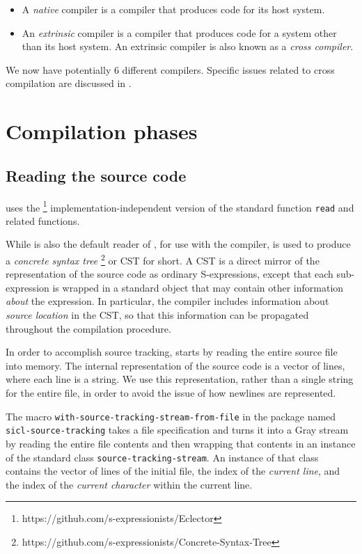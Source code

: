 \begin{itemize}
\item A \emph{native} compiler is a compiler that produces code for
  its host \commonlisp{} system. 
\item An \emph{extrinsic} compiler is a compiler that produces code
  for a \commonlisp{} system other than its host system.  An extrinsic
  compiler is also known as a \emph{cross compiler}.
\end{itemize}

We now have potentially 6 different compilers.  Specific issues
related to cross compilation are discussed in
. 

\section{Compilation phases}

\subsection{Reading the source code}

\sysname{} uses the \eclector{}%
\footnote{https://github.com/s-expressionists/Eclector}
implementation-independent version of the standard function
\texttt{read} and related functions.

While \eclector{} is also the default reader of \sysname{}, for use
with the compiler, \eclector{} is used to produce a \emph{concrete
  syntax tree}%
\footnote{https://github.com/s-expressionists/Concrete-Syntax-Tree} or
CST for short.  A CST is a direct mirror of the representation of the
source code as ordinary S-expressions, except that each sub-expression
is wrapped in a standard object that may contain other information
\emph{about} the expression.  In particular, the \sysname{} compiler
includes information about \emph{source location} in the CST, so that
this information can be propagated throughout the compilation
procedure.

In order to accomplish source tracking, \sysname{} starts by reading
the entire source file into memory.  The internal representation of
the source code is a vector of lines, where each line is a string.  We
use this representation, rather than a single string for the entire
file, in order to avoid the issue of how newlines are represented.

The macro \texttt{with-source-tracking-stream-from-file} in the
package named \texttt{sicl-source-tracking} takes a file
specification and turns it into a Gray stream by reading the entire
file contents and then wrapping that contents in an instance of the
standard class \texttt{source-tracking-stream}.  An instance of that
class contains the vector of lines of the initial file, the index of the
\emph{current line}, and the index of the \emph{current character}
within the current line.

